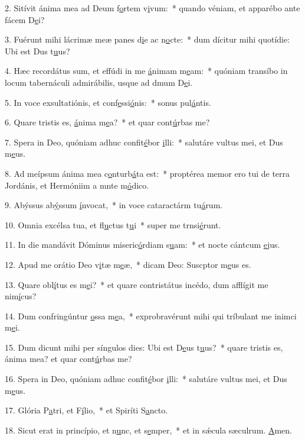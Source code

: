 2. Sitívit ánima mea ad Deum f\uline{o}rtem v\uline{i}vum:~* quando véniam, et apparébo ante fácem D\uline{e}i?\par 
3. Fuérunt mihi lácrimæ meæ panes d\uline{i}e ac n\uline{o}cte:~* dum dícitur mihi quotídie: Ubi est Dus t\uline{u}us?\par 
4. Hæc recordátus sum, et effúdi in me \uline{á}nimam m\uline{e}am:~* quóniam transíbo in locum tabernáculi admirábilis, usque ad dmum D\uline{e}i.\par 
5. In voce exsultatiónis, et conf\uline{e}ssi\uline{ó}nis:~* sonus pul\uline{á}ntis.\par 
6. Quare tristis es, \uline{á}nima m\uline{e}a?~* et quar cont\uline{ú}rbas me?\par 
7. Spera in Deo, quóniam adhuc confit\uline{é}bor \uline{i}lli:~* salutáre vultus mei, et Dus m\uline{e}us.\par 
8. Ad meípsum ánima mea c\uline{o}nturb\uline{á}ta est:~* proptérea memor ero tui de terra Jordánis, et Hermóniim a mnte m\uline{ó}dico.\par 
9. Abýssus ab\uline{ý}ssum \uline{í}nvocat,~* in voce cataractárm tu\uline{á}rum.\par 
10. Omnia excélsa tua, et fl\uline{u}ctus t\uline{u}i~* super me trnsi\uline{é}runt.\par 
11. In die mandávit Dóminus miseric\uline{ó}rdiam s\uline{u}am:~* et nocte cántcum \uline{e}jus.\par 
12. Apud me orátio Deo v\uline{i}tæ m\uline{e}æ,~* dicam Deo: Suscptor m\uline{e}us es.\par 
13. Quare obl\uline{í}tus es m\uline{e}i?~* et quare contristátus incédo, dum afflígit me nim\uline{í}cus?\par 
14. Dum confringúntur \uline{o}ssa m\uline{e}a,~* exprobravérunt mihi qui tríbulant me inimci m\uline{e}i.\par 
15. Dum dicunt mihi per síngulos dies: Ubi est D\uline{e}us t\uline{u}us?~* quare tristis es, ánima mea? et quar cont\uline{ú}rbas me?\par 
16. Spera in Deo, quóniam adhuc confit\uline{é}bor \uline{i}lli:~* salutáre vultus mei, et Dus m\uline{e}us.\par 
17. Glória P\uline{a}tri, et F\uline{í}lio,~* et Spiríti S\uline{a}ncto.\par 
18. Sicut erat in princípio, et n\uline{u}nc, et s\uline{e}mper,~* et in sǽcula sæculrum. \uline{A}men.\par 
